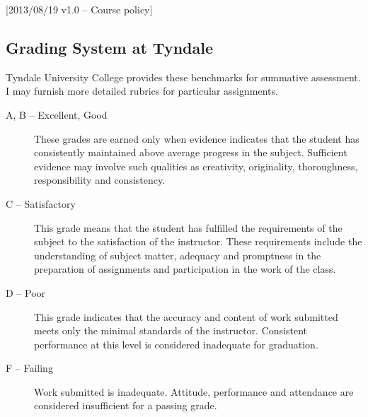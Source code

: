 [2013/08/19 v1.0 -- Course policy]

\subsection{Grading System at Tyndale}
\label{grades}

Tyndale University College provides these benchmarks for summative assessment.
I may furnish more detailed rubrics for particular assignments.


\begin{description}
  \item[A, B -- Excellent, Good]
    These grades are earned only when evidence indicates that the student
    has consistently maintained above average progress in the subject.
    Sufficient evidence may involve such qualities as creativity, originality,
    thoroughness, responsibility and consistency.
  \item[C -- Satisfactory]
    This grade means that the student has fulfilled the requirements of the
    subject to the satisfaction of the instructor. These requirements include
    the understanding of subject matter, adequacy and promptness in the
    preparation of assignments and participation in the work of the class.
  \item[D -- Poor]
    This grade indicates that the accuracy and content of work submitted meets
    only the minimal standards of the instructor. Consistent performance at
    this level is considered inadequate for graduation.
  \item[F -- Failing]
    Work submitted is inadequate. Attitude, performance and attendance are
    considered insufficient for a passing grade.
\end{description}
